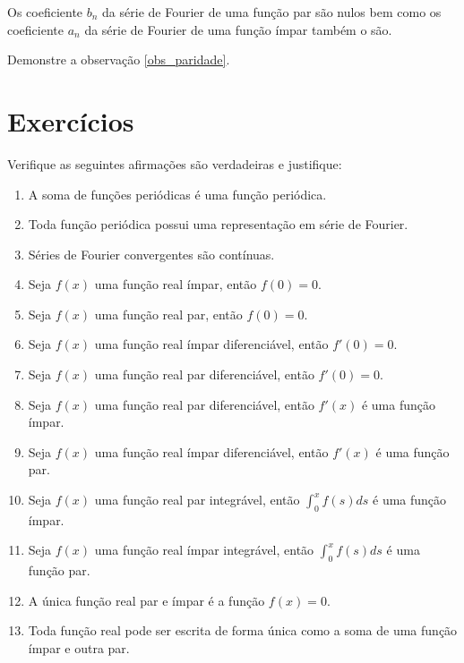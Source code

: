 \begin{obs}{\label{obs_paridade}} Os coeficiente $b_n$ da série de Fourier de uma função par são nulos bem como os coeficiente $a_n$ da série de Fourier de uma função ímpar também o são.
\end{obs}
\begin{prob}Demonstre a observação \ref{obs_paridade}.
\end{prob}







\section{Exercícios}
 
 
 \begin{Exercise}Verifique as seguintes afirmações são verdadeiras e justifique:
\begin{enumerate} 
\item A soma de funções periódicas é uma função periódica.
\item Toda função periódica possui uma representação em série de Fourier.
\item Séries de Fourier convergentes são contínuas.
\item Seja $f(x)$ uma função real ímpar, então $f(0)=0$.
\item Seja $f(x)$ uma função real par, então $f(0)=0$.
\item Seja $f(x)$ uma função real ímpar diferenciável, então $f'(0)=0$.
\item Seja $f(x)$ uma função real par diferenciável, então $f'(0)=0$.
\item Seja $f(x)$ uma função real par diferenciável, então $f'(x)$ é uma função ímpar.
\item Seja $f(x)$ uma função real ímpar diferenciável, então $f'(x)$ é uma função par.
\item Seja $f(x)$ uma função real par integrável, então $\int_0^xf(s)ds$ é uma função ímpar.
\item Seja $f(x)$ uma função real ímpar integrável, então $\int_0^xf(s)ds$ é uma função par.
\item A única função real par e ímpar é a função $f(x)=0$.
\item Toda função real pode ser escrita de forma única como a soma de uma função ímpar e outra par.
\end{enumerate}
\end{Exercise}

